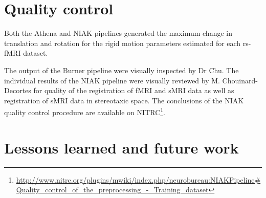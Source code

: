 \documentclass[preprint,12pt,5p]{elsarticle}
\begin{document}
\begin{itemize}
\section{Quality control}

Both the Athena and NIAK pipelines generated the maximum change in translation and rotation for the rigid motion parameters estimated for each rs-fMRI dataset. 

 


The output of the Burner pipeline were visually inspected by Dr Chu. The individual results of the NIAK pipeline were visually reviewed by M. Chouinard-Decortes for quality of the registration of fMRI and sMRI data as well as registration of sMRI data in stereotaxic space. The conclusions of the NIAK quality control procedure are available on NITRC\footnote{\url{http://www.nitrc.org/plugins/mwiki/index.php/neurobureau:NIAKPipeline#Quality_control_of_the_preprocessing_-_Training_dataset}}.

\section{Lessons learned and future work}


\end{itemize}
\end{document}
